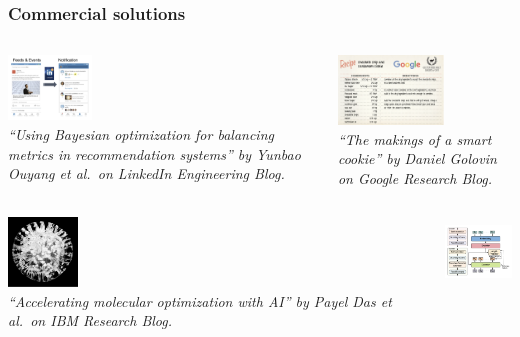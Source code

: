\documentclass[aspectratio=169]{beamer}
\begin{document}
\begin{frame}\frametitle{Commercial solutions}
\begin{columns}
\begin{column}{0.5\textwidth}
\begin{center}
\includegraphics[width=6em]{../img/probs/linkedin-notifications.png}\\
{\tiny \sl
``Using Bayesian optimization for balancing metrics in recommendation systems''
by Yunbao Ouyang et al.\ on LinkedIn Engineering Blog.\\
}
\end{center}
\end{column}
\begin{column}{0.5\textwidth}
\begin{center}
\includegraphics[height=5em]{../img/probs/google-cookies.png}\\
{\tiny \sl
``The makings of a smart cookie''
by Daniel Golovin on Google Research Blog.\\
}
\end{center}
\end{column}
\end{columns}
\begin{columns}
\begin{column}{0.33\textwidth}
\begin{center}
\includegraphics[width=5em]{../img/probs/ibm-sdl.png}\\
{\tiny \sl
``Accelerating molecular optimization with AI'' by Payel Das et al.\
on IBM Research Blog.\\
}
\end{center}
\end{column}
\begin{column}{0.33\textwidth}
\begin{center}
\includegraphics[height=5em]{../img/probs/meta-nas.png}\\

\end{center}
\end{column}
\end{columns}
\end{frame}
\end{document}

